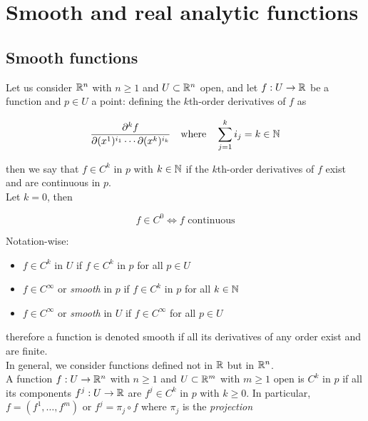 \section{Smooth and real analytic functions}

\subsection{Smooth functions}

Let us consider $ \mathbb{R}^{n} $ with $ n \geqslant 1 $ and $ U \subset \mathbb{R}^{n} $ open, and let $ f : U \to \mathbb{R} $ be a function and $ p \in U $ a point: defining the $ k $th-order derivatives of $ f $ as

\begin{equation}
	\dfrac{\partial^{k} f}{\partial (x^{1})^{i_{1}} \cdots \partial (x^{k})^{i_{k}}} %
	\qq{where} \sum_{j=1}^{k} i_{j} = k \in \N
\end{equation}

then we say that $ f \in C^{k} $ in $ p $ with $ k \in \mathbb{N} $ if the $ k $th-order derivatives of $ f $ exist and are continuous in $ p $. \\
Let $ k = 0 $, then

\begin{equation}
	f \in C^{0} \iff f \text{ continuous}
\end{equation}

Notation-wise:

\begin{itemize}
	\item $ f \in C^{k} $ in $ U $ if $ f \in C^{k} $ in $ p $ for all $ p \in U $
	
	\item $ f \in C^{\infty} $ or \textit{smooth} in $ p $ if $ f \in C^{k} $ in $ p $ for all $ k \in \mathbb{N} $
	
	\item $ f \in C^{\infty} $ or \textit{smooth} in $ U $ if $ f \in C^{\infty} $ for all $ p \in U $
\end{itemize}

therefore a function is denoted smooth if all its derivatives of any order exist and are finite. \\
In general, we consider functions defined not in $ \mathbb{R} $ but in $ \mathbb{R}^{n} $. \\
A function $ f : U \to \mathbb{R}^{n} $ with $ n \geqslant 1 $ and $ U \subset \mathbb{R}^{m} $ with $ m \geqslant 1 $ open is $ C^{k} $ in $ p $ if all its components $ f^{j} : U \to \mathbb{R} $ are $ f^{j} \in C^{k} $ in $ p $ with $ k \geqslant 0 $. In particular, $ f = (f^{1}, \dots, f^{m}) $ or $ f^{j} = \pi_{j} \circ f $ where $ \pi_{j} $ is the \textit{projection}

